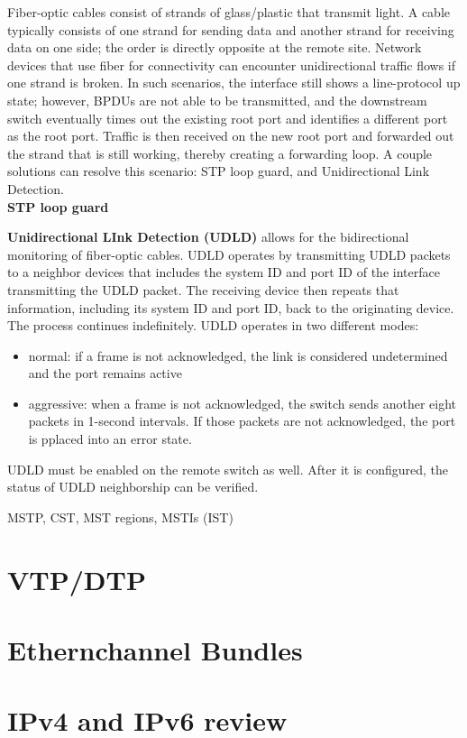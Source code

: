 \documentclass{article}
\begin{document}
Fiber-optic cables consist of strands of glass/plastic that transmit light. A cable typically consists of one strand for sending data and another strand for receiving data on one side; the order is directly opposite at the remote site. Network devices that use fiber for connectivity can encounter unidirectional traffic flows if one strand is broken. In such scenarios, the interface still shows a line-protocol up state; however, BPDUs are not able to be transmitted, and the downstream switch eventually times out the existing root port and identifies a different port as the root port. Traffic is then received on the new root port and forwarded out the strand that is still working, thereby creating a forwarding loop. A couple solutions can resolve this scenario: STP loop guard, and Unidirectional Link Detection.\\

\textbf{STP loop guard}


\textbf{Unidirectional LInk Detection (UDLD)} allows for the bidirectional monitoring of fiber-optic cables. UDLD operates by transmitting UDLD packets to a neighbor devices that includes the system ID and port ID of the interface transmitting the UDLD packet. The receiving device then repeats that information, including its system ID and port ID, back to the originating device. The process continues indefinitely. UDLD operates in two different modes:
	\begin{itemize}
		\item normal: if a frame is not acknowledged, the link is considered undetermined and the port remains active
		\item aggressive: when a frame is not acknowledged, the switch sends another eight packets in 1-second intervals. If those packets are not acknowledged, the port is pplaced into an error state.
	\end{itemize}
UDLD must be enabled on the remote switch as well. After it is configured, the status of UDLD neighborship can be verified.


MSTP, CST, MST regions, MSTIs (IST)\\  


\section*{VTP/DTP}

\section*{Ethernchannel Bundles}


\section*{IPv4 and IPv6 review}
\end{document}
